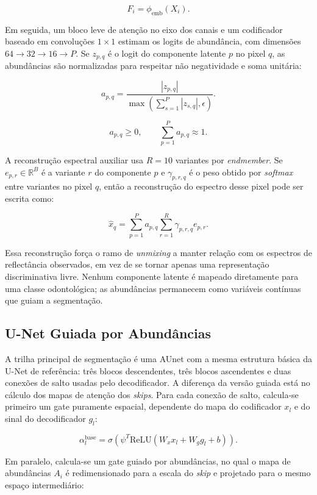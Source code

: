 \documentclass[conference]{IEEEtran}
\begin{document}
\[
F_i = \phi_{\mathrm{emb}}(X_i).
\]

Em seguida, um bloco leve de atenção no eixo dos canais e um codificador
baseado em convoluções $1\times1$ estimam os logits de abundância, com
dimensões $64\rightarrow32\rightarrow16\rightarrow P$. Se $z_{p,q}$ é o logit
do componente latente $p$ no pixel $q$, as abundâncias são normalizadas para
respeitar não negatividade e soma unitária:

\[
a_{p,q} =
\frac{|z_{p,q}|}
{\max\left(\sum_{s=1}^{P}|z_{s,q}|,\epsilon\right)}.
\]

\[
a_{p,q}\ge 0,\qquad
\sum_{p=1}^{P}a_{p,q}\approx 1.
\]

A reconstrução espectral auxiliar usa $R=10$ variantes por \textit{endmember}.
Se $e_{p,r}\in\mathbb{R}^{B}$ é a variante $r$ do componente $p$ e
$\gamma_{p,r,q}$ é o peso obtido por \textit{softmax} entre variantes no pixel
$q$, então a reconstrução do espectro desse pixel pode ser escrita como:

\[
\hat{x}_q =
\sum_{p=1}^{P} a_{p,q}
\sum_{r=1}^{R}\gamma_{p,r,q}e_{p,r}.
\]

Essa reconstrução força o ramo de \textit{unmixing} a manter relação com os
espectros de reflectância observados, em vez de se tornar apenas uma
representação discriminativa livre. Nenhum componente latente é mapeado
diretamente para uma classe odontológica; as abundâncias permanecem como
variáveis contínuas que guiam a segmentação.

\subsection{U-Net Guiada por Abundâncias}

A trilha principal de segmentação é uma AUnet com a mesma estrutura
básica da U-Net de referência: três blocos descendentes, três blocos ascendentes
e duas conexões de salto usadas pelo decodificador. A diferença da versão guiada
está no cálculo dos mapas de atenção dos \textit{skips}. Para cada conexão de
salto, calcula-se primeiro um gate puramente espacial, dependente do mapa do
codificador $x_l$ e do sinal do decodificador $g_l$:

\[
\alpha_l^{\mathrm{base}} =
\sigma\left(
\psi^{T}
\mathrm{ReLU}(W_xx_l+W_gg_l+b)
\right).
\]

Em paralelo, calcula-se um gate guiado por abundâncias, no qual o mapa de
abundâncias $A_i$ é redimensionado para a escala do \textit{skip} e projetado
para o mesmo espaço intermediário:
\end{document}
